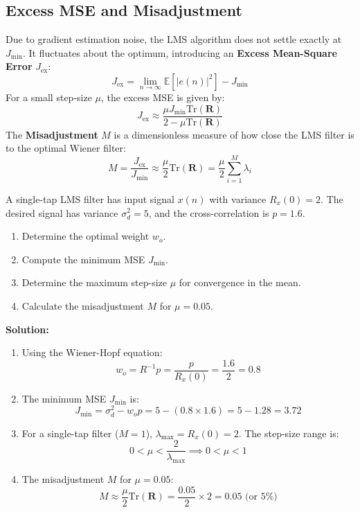 \documentclass[12pt,a4paper]{article}
\begin{document}
\subsection{Excess MSE and Misadjustment}
Due to gradient estimation noise, the LMS algorithm does not settle exactly at $J_{\text{min}}$. It fluctuates about the optimum, introducing an \textbf{Excess Mean-Square Error} $J_{\text{ex}}$:
\begin{equation}
  J_{\text{ex}} = \lim_{n\to\infty} \mathbb{E}[|e(n)|^2] - J_{\text{min}}
\end{equation}
For a small step-size $\mu$, the excess MSE is given by:
\begin{equation}
  J_{\text{ex}} \approx \frac{\mu J_{\text{min}} \text{Tr}(\mathbf{R})}{2 - \mu \text{Tr}(\mathbf{R})}
\end{equation}
The \textbf{Misadjustment} $M$ is a dimensionless measure of how close the LMS filter is to the optimal Wiener filter:
\begin{equation}
  M = \frac{J_{\text{ex}}}{J_{\text{min}}} \approx \frac{\mu}{2} \text{Tr}(\mathbf{R}) = \frac{\mu}{2} \sum_{i=1}^M \lambda_i
\end{equation}

\begin{tcolorbox}[examplebox, title={Example: Wiener Filter Coefficient Design}]
A single-tap LMS filter has input signal $x(n)$ with variance $R_x(0) = 2$. The desired signal has variance $\sigma_d^2 = 5$, and the cross-correlation is $p = 1.6$. 
\begin{enumerate}[label=\textbf{\arabic*.}, leftmargin=*, itemsep=2pt]
  \item Determine the optimal weight $w_o$.
  \item Compute the minimum MSE $J_{\text{min}}$.
  \item Determine the maximum step-size $\mu$ for convergence in the mean.
  \item Calculate the misadjustment $M$ for $\mu = 0.05$.
\end{enumerate}

\textbf{Solution:}
\begin{enumerate}[label=\textbf{\arabic*.}, leftmargin=*, itemsep=4pt]
  \item Using the Wiener-Hopf equation:
    \[
      w_o = R^{-1}p = \frac{p}{R_x(0)} = \frac{1.6}{2} = 0.8
    \]
  \item The minimum MSE $J_{\text{min}}$ is:
    \[
      J_{\text{min}} = \sigma_d^2 - w_o p = 5 - (0.8 \times 1.6) = 5 - 1.28 = 3.72
    \]
  \item For a single-tap filter ($M=1$), $\lambda_{\text{max}} = R_x(0) = 2$. The step-size range is:
    \[
      0 < \mu < \frac{2}{\lambda_{\text{max}}} \implies 0 < \mu < 1
    \]
  \item The misadjustment $M$ for $\mu = 0.05$:
    \[
      M \approx \frac{\mu}{2} \text{Tr}(\mathbf{R}) = \frac{0.05}{2} \times 2 = 0.05 \text{ (or 5\%)}
    \]
\end{enumerate}
\end{tcolorbox}
\end{document}
